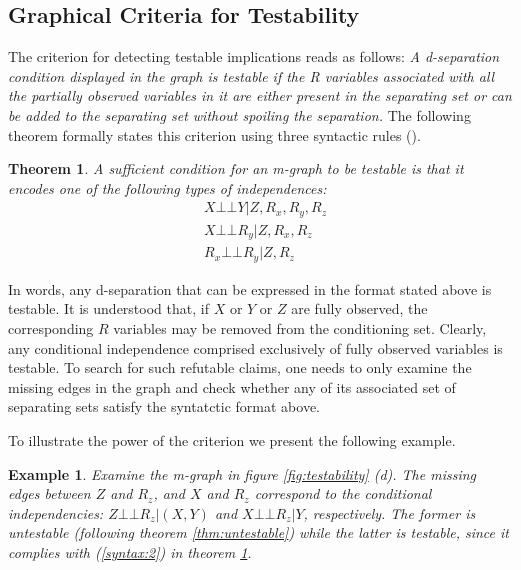 \documentclass[12pt]{article}
\newcommand{\compos}{\mbox{$\bot\!\!\!\bot$}}
\newtheorem{example}{Example}
\newtheorem{thm}{Theorem}
\begin{document}
\subsection{Graphical Criteria for Testability} \label{sec:syntax}
The criterion for detecting testable implications reads as follows:\textit{ A d-separation condition displayed in the graph is testable if the R variables associated with all the
partially observed variables in it are either present in the separating set or can be added to the separating set without
spoiling the separation. }
The following theorem formally states this criterion using three syntactic rules (\cite{mohan2013test}). 
\begin{thm}
A sufficient condition for an m-graph to be testable is that it encodes one of the following types of independences: %
\begin{align}
 & X \compos Y | Z, R_x, R_y, R_z \label{syntax:1}\\
 & X \compos R_y | Z, R_x, R_z \label{syntax:2}\\
 & R_x \compos R_y | Z, R_z \label{syntax:3}
\end{align}
\label{thm:test:sufficient}
\end{thm}
In words, any d-separation that can be expressed in the format stated above is  testable.
It is understood that, if $X$ or $Y$ or $Z$ are fully
observed, the corresponding $R$ variables may be removed from
the conditioning set. Clearly, any conditional independence
comprised exclusively of fully observed variables is testable. To search for such refutable claims, one needs to only examine the missing edges in the graph and check whether any of its associated set of separating sets satisfy the syntatctic format above.

To illustrate the power of the criterion we present the following example. 
\begin{example}
	Examine the m-graph in figure \ref{fig:testability} (d). The missing edges between $Z$ and $R_z$, and $X$ and $R_z$ correspond to the conditional  independencies: $Z \compos R_z|(X,Y)$ and $X \compos R_z|Y$, respectively. The former is untestable (following theorem \ref{thm:untestable}) while the latter is testable, since it complies
	with (\ref{syntax:2}) in theorem \ref{thm:test:sufficient}.
\end{example} 
\end{document}
